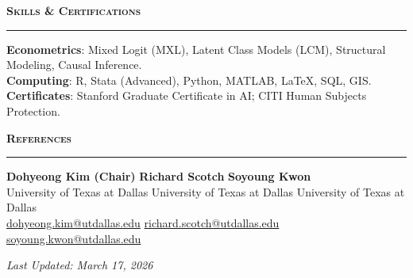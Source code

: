 \documentclass[11pt, letterpaper]{article}
\newcommand{\ressection}[1]{
    \vspace{10pt}
    \noindent\textbf{\large \textsc{#1}}
    \vspace{-2pt}
    \hrule
    \vspace{5pt}
}
\begin{document}
\ressection{Skills \& Certifications}
\noindent \textbf{Econometrics}: Mixed Logit (MXL), Latent Class Models (LCM), Structural Modeling, Causal Inference. \\
\textbf{Computing}: R, Stata (Advanced), Python, MATLAB, \LaTeX, SQL, GIS. \\
\textbf{Certificates}: Stanford Graduate Certificate in AI; CITI Human Subjects Protection.

\ressection{References}
\noindent \textbf{Dohyeong Kim (Chair)} \hfill \textbf{Richard Scotch} \hfill \textbf{Soyoung Kwon} \\
University of Texas at Dallas \hfill University of Texas at Dallas \hfill University of Texas at Dallas \\
\href{mailto:dohyeong.kim@utdallas.edu}{dohyeong.kim@utdallas.edu} \hfill \href{mailto:richard.scotch@utdallas.edu}{richard.scotch@utdallas.edu} \hfill \href{mailto:soyoung.kwon@utdallas.edu}{soyoung.kwon@utdallas.edu}

\vfill
\begin{center}
    \footnotesize \textit{Last Updated: March 17, 2026}
\end{center}
\end{document}
